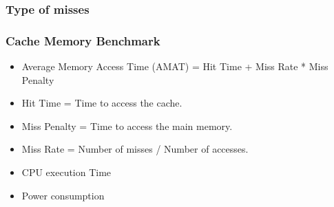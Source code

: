 \begin{frame}
    \frametitle{Type of misses}
\end{frame}

\begin{frame}
    \frametitle{Cache Memory Benchmark}
    \begin{itemize}
        \item Average Memory Access Time (AMAT) = Hit Time + Miss Rate * Miss Penalty
        \item Hit Time = Time to access the cache.
        \item Miss Penalty = Time to access the main memory.
        \item Miss Rate = Number of misses / Number of accesses.
        \item CPU execution Time
        \item Power consumption
    \end{itemize}
\end{frame}